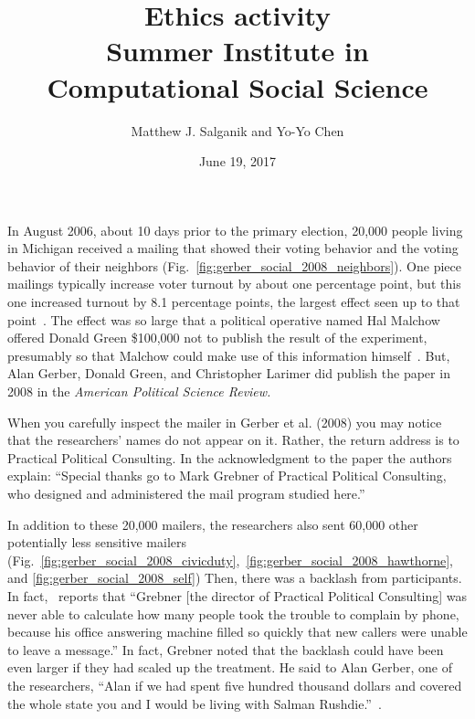 \documentclass{article}
\title{Ethics activity\\Summer Institute in Computational Social Science\footnotemark[1]}
\author{Matthew J. Salganik and Yo-Yo Chen}
\date{June 19, 2017}
\begin{document}
\maketitle
\renewcommand{\thefootnote}{\fnsymbol{footnote}}
\thispagestyle{empty}
\renewcommand{\thefootnote}{\arabic{footnote}}

In August 2006, about 10 days prior to the primary election, 20,000 people living in Michigan received a mailing that showed their voting behavior and the voting behavior of their neighbors (Fig.~\ref{fig:gerber_social_2008_neighbors}). One piece mailings typically increase voter turnout by about one percentage point, but this one increased turnout by 8.1 percentage points, the largest effect seen up to that point~\citep{gerber_social_2008}.  The effect was so large that a political operative named Hal Malchow offered Donald Green \$100,000 not to publish the result of the experiment, presumably so that Malchow could make use of this information himself~\citep[p. 304]{issenberg_victory_2012}.  But, Alan Gerber, Donald Green, and Christopher Larimer did publish the paper in 2008 in the \textit{American Political Science Review.}  

When you carefully inspect the mailer in Gerber et al. (2008) you may notice that the researchers' names do not appear on it.  Rather, the return address is to Practical Political Consulting.  In the acknowledgment to the paper the authors explain: ``Special thanks go to Mark Grebner of Practical Political Consulting, who designed and administered the mail program studied here.''
 
In addition to these 20,000 mailers, the researchers also sent 60,000 other potentially less sensitive mailers (Fig.~\ref{fig:gerber_social_2008_civicduty},~\ref{fig:gerber_social_2008_hawthorne}, and \ref{fig:gerber_social_2008_self}) Then, there was a backlash from participants.  In fact,~\citet[p. 198]{issenberg_victory_2012} reports that ``Grebner [the director of Practical Political Consulting] was never able to calculate how many people took the trouble to complain by phone, because his office answering machine filled so quickly that new callers were unable to leave a message.'' In fact, Grebner noted that the backlash could have been even larger if they had scaled up the treatment.  He said to Alan Gerber, one of the researchers, ``Alan if we had spent five hundred thousand dollars and covered the whole state you and I would be living with Salman Rushdie.''~\citep[p. 200]{issenberg_victory_2012}.
 
\end{document}
